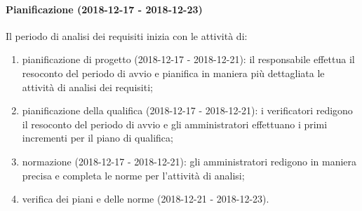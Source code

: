 		\paragraph{Pianificazione (2018-12-17 - 2018-12-23)\\} Il periodo di analisi dei requisiti inizia con le attività di:
			\begin{enumerate}[label = 2.1.\arabic*)]
				\item pianificazione di progetto (2018-12-17 - 2018-12-21): il responsabile effettua il resoconto del periodo di avvio e pianifica in maniera più dettagliata le attività di analisi dei requisiti; 
				\item pianificazione della qualifica (2018-12-17 - 2018-12-21): i verificatori redigono il resoconto del periodo di avvio e gli amministratori effettuano i primi incrementi per il piano di qualifica;
				\item normazione (2018-12-17 - 2018-12-21): gli amministratori redigono in maniera precisa e completa le norme per l'attività di analisi;
				\item verifica dei piani e delle norme (2018-12-21 - 2018-12-23).
			\end{enumerate}
		
